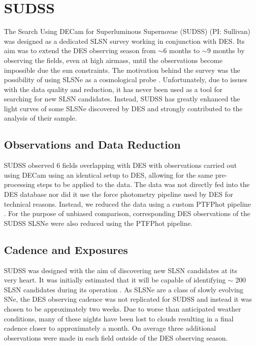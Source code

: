 \section{SUDSS} \label{sec:SUDSS}
The Search Using DECam for Superluminous Supernovae (SUDSS) (PI: Sullivan) was designed as a dedicated SLSN survey working in conjunction with DES. Its aim was to extend the DES observing season from $\sim$6 months to $\sim$9 months by observing the fields, even at high airmass, until the observations become impossible due the sun constraints. The motivation behind the survey was the possibility of using SLSNe as a cosmological probe \citep{Inserra2014}. Unfortunately, due to issues with the data quality and reduction, it has never been used as a tool for searching for new SLSN candidates. Instead, SUDSS has greatly enhanced the light curves of some SLSNe discovered by DES and strongly contributed to the analysis of their sample.

\subsection{Observations and Data Reduction}
SUDSS observed 6 fields overlapping with DES with observations carried out using DECam using an identical setup to DES, allowing for the same pre-processing steps to be applied to the data. The data was not directly fed into the DES database nor did it use the force photometry pipeline used by DES for technical reasons. Instead, we reduced the data using a custom PTFPhot pipeline \citep{Firth2015}. For the purpose of unbiased comparison, corresponding DES observations of the SUDSS SLSNe were also reduced using the PTFPhot pipeline.

\subsection{Cadence and Exposures}
\label{sec:SUDSSCadance}
SUDSS was designed with the aim of discovering new SLSN candidates at its very heart. It was initially estimated that it will be capable of identifying $\sim$ 200 SLSN candidates during its operation \citep{Papadopoulos2015}. As SLSNe are a class of slowly evolving SNe, the DES observing cadence was not replicated for SUDSS and instead it was chosen to be approximately two weeks. Due to worse than anticipated weather conditions, many of these nights have been lost to clouds resulting in a final cadence closer to approximately a month. On average three additional observations were made in each field outside of the DES observing season.

